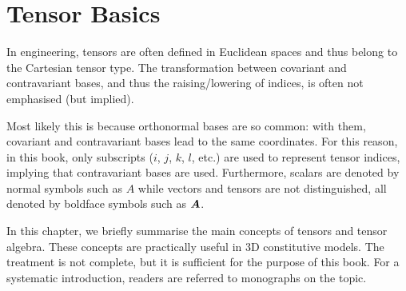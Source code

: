 \chapter{Tensor Basics}\label{chap:tensor}
In engineering, tensors are often defined in Euclidean spaces and thus belong to the Cartesian tensor type.
The transformation between covariant and contravariant bases, and thus the raising/lowering of indices, is often not emphasised (but implied).

Most likely this is because orthonormal bases are so common: with them, covariant and contravariant bases lead to the same coordinates.
For this reason, in this book, only subscripts ($i$, $j$, $k$, $l$, etc.) are used to represent tensor indices, implying that contravariant bases are used.
Furthermore, scalars are denoted by normal symbols such as $A$ while vectors and tensors are not distinguished, all denoted by boldface symbols such as $\bm{A}$.

In this chapter, we briefly summarise the main concepts of tensors and tensor algebra.
These concepts are practically useful in 3D constitutive models.
The treatment is not complete, but it is sufficient for the purpose of this book.
For a systematic introduction, readers are referred to monographs on the topic.

